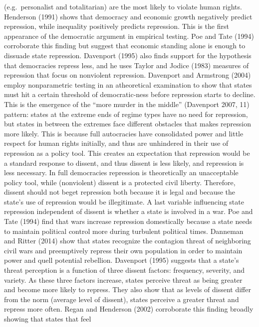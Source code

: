\documentclass[ignorenonframetext,]{beamer}
\begin{document}
\begin{frame}[fragile]
(e.g.~personalist and totalitarian) are the most likely to violate human
rights. Henderson (1991) shows that democracy and economic growth
negatively predict repression, while inequality positively predicts
repression. This is the first appearance of the democratic argument in
empirical testing. Poe and Tate (1994) corroborate this finding but
suggest that economic standing alone is enough to dissuade state
repression. Davenport (1995) also finds support for the hypothesis that
democracies repress less, and he uses Taylor and Jodice (1983) measures
of repression that focus on nonviolent repression. Davenport and
Armstrong (2004) employ nonparametric testing in an atheoretical
examination to show that states must hit a certain threshold of
democratic-ness before repression starts to decline. This is the
emergence of the ``more murder in the middle'' (Davenport 2007, 11)
pattern: states at the extreme ends of regime types have no need for
repression, but states in between the extremes face different obstacles
that makes repression more likely. This is because full autocracies have
consolidated power and little respect for human rights initially, and
thus are unhindered in their use of repression as a policy tool. This
creates an expectation that repression would be a standard response to
dissent, and thus dissent is less likely, and repression is less
necessary. In full democracies repression is theoretically an
unacceptable policy tool, while (nonviolent) dissent is a protected
civil liberty. Therefore, dissent should not beget repression both
because it is legal and because the state's use of repression would be
illegitimate. A last variable influencing state repression independent
of dissent is whether a state is involved in a war. Poe and Tate (1994)
find that wars increase repression domestically because a state needs to
maintain political control more during turbulent political times.
Danneman and Ritter (2014) show that states recognize the contagion
threat of neighboring civil wars and preemptively repress their own
population in order to maintain power and quell potential rebellion.
Davenport (1995) suggests that a state's threat perception is a function
of three dissent factors: frequency, severity, and variety. As these
three factors increase, states perceive threat as being greater and
become more likely to repress. They also show that as levels of dissent
differ from the norm (average level of dissent), states perceive a
greater threat and repress more often. Regan and Henderson (2002)
corroborate this finding broadly showing that states that feel

\end{frame}
\end{document}
